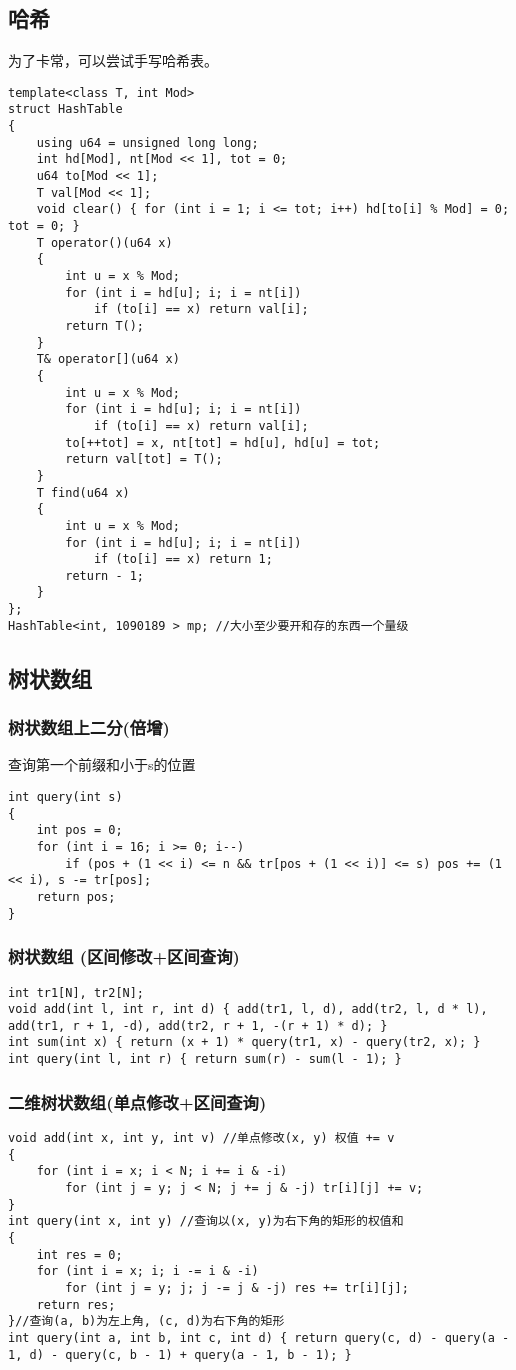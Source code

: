 \documentclass[a4paper, fontset=none]{ctexart}
\begin{document}
\subsection{哈希}
为了卡常，可以尝试手写哈希表。
\begin{verbatim}
template<class T, int Mod>
struct HashTable
{
    using u64 = unsigned long long;
    int hd[Mod], nt[Mod << 1], tot = 0;
    u64 to[Mod << 1];
    T val[Mod << 1];
    void clear() { for (int i = 1; i <= tot; i++) hd[to[i] % Mod] = 0; tot = 0; }
    T operator()(u64 x)
    {
        int u = x % Mod;
        for (int i = hd[u]; i; i = nt[i])
            if (to[i] == x) return val[i];
        return T();
    }
    T& operator[](u64 x)
    {
        int u = x % Mod;
        for (int i = hd[u]; i; i = nt[i])
            if (to[i] == x) return val[i];
        to[++tot] = x, nt[tot] = hd[u], hd[u] = tot;
        return val[tot] = T();
    }
    T find(u64 x)
    {
        int u = x % Mod;
        for (int i = hd[u]; i; i = nt[i])
            if (to[i] == x) return 1;
        return - 1;
    }
};
HashTable<int, 1090189 > mp; //大小至少要开和存的东西一个量级
\end{verbatim}
\subsection{树状数组}
\subsubsection{树状数组上二分(倍增)}

查询第一个前缀和小于s的位置

\begin{verbatim}
int query(int s)
{
    int pos = 0;
    for (int i = 16; i >= 0; i--)
        if (pos + (1 << i) <= n && tr[pos + (1 << i)] <= s) pos += (1 << i), s -= tr[pos];
    return pos;
}
\end{verbatim}
\subsubsection{树状数组 (区间修改+区间查询)}
\begin{verbatim}
int tr1[N], tr2[N];
void add(int l, int r, int d) { add(tr1, l, d), add(tr2, l, d * l), add(tr1, r + 1, -d), add(tr2, r + 1, -(r + 1) * d); }
int sum(int x) { return (x + 1) * query(tr1, x) - query(tr2, x); }
int query(int l, int r) { return sum(r) - sum(l - 1); }
\end{verbatim}
\subsubsection{二维树状数组(单点修改+区间查询)}
\begin{verbatim}
void add(int x, int y, int v) //单点修改(x, y) 权值 += v
{
    for (int i = x; i < N; i += i & -i)
        for (int j = y; j < N; j += j & -j) tr[i][j] += v;
}
int query(int x, int y) //查询以(x, y)为右下角的矩形的权值和
{
    int res = 0;
    for (int i = x; i; i -= i & -i)
        for (int j = y; j; j -= j & -j) res += tr[i][j];
    return res;
}//查询(a, b)为左上角, (c, d)为右下角的矩形
int query(int a, int b, int c, int d) { return query(c, d) - query(a - 1, d) - query(c, b - 1) + query(a - 1, b - 1); }
\end{verbatim}
\end{document}

